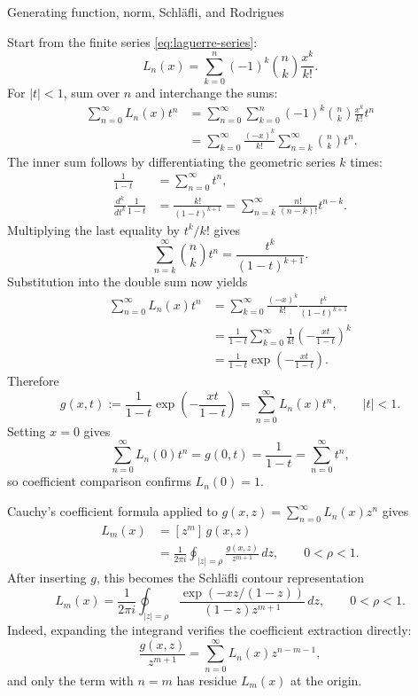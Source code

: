 \documentclass[11pt]{beamer}
\begin{document}
\begin{frame}[allowframebreaks]{Generating function, norm, Schl\"afli, and Rodrigues}
\footnotesize

Start from the finite series \eqref{eq:laguerre-series}:
\[
  L_n(x)=\sum_{k=0}^{n}(-1)^k\binom{n}{k}\frac{x^k}{k!}.
\]
For $|t|<1$, sum over $n$ and interchange the sums:
\begin{align*}
  \sum_{n=0}^{\infty}L_n(x)t^n
   &=
     \sum_{n=0}^{\infty}
     \sum_{k=0}^{n}
       (-1)^k\binom{n}{k}\frac{x^k}{k!}t^n\\
   &=
     \sum_{k=0}^{\infty}\frac{(-x)^k}{k!}
     \sum_{n=k}^{\infty}\binom{n}{k}t^n.
\end{align*}
The inner sum follows by differentiating the geometric series $k$ times:
\begin{align*}
  \frac{1}{1-t}
    &=\sum_{n=0}^{\infty}t^n,\\
  \frac{d^k}{dt^k}\frac{1}{1-t}
    &=\frac{k!}{(1-t)^{k+1}}
      =\sum_{n=k}^{\infty}\frac{n!}{(n-k)!}t^{n-k}.
\end{align*}
Multiplying the last equality by $t^k/k!$ gives
\[
  \sum_{n=k}^{\infty}\binom{n}{k}t^n
    =\frac{t^k}{(1-t)^{k+1}}.
\]
Substitution into the double sum now yields
\begin{align*}
  \sum_{n=0}^{\infty}L_n(x)t^n
    &=
      \sum_{k=0}^{\infty}
      \frac{(-x)^k}{k!}
      \frac{t^k}{(1-t)^{k+1}}\\
    &=
      \frac{1}{1-t}
      \sum_{k=0}^{\infty}
      \frac{1}{k!}
      \left(-\frac{xt}{1-t}\right)^k\\
    &=
      \frac{1}{1-t}
      \exp\!\left(-\frac{xt}{1-t}\right).
\end{align*}
Therefore
\begin{equation}
  g(x,t)
    :=\frac{1}{1-t}\exp\!\left(-\frac{xt}{1-t}\right)
    =\sum_{n=0}^{\infty}L_n(x)t^n,
  \qquad |t|<1.
  \label{eq:laguerre-gen}
\end{equation}
Setting $x=0$ gives
\[
  \sum_{n=0}^{\infty}L_n(0)t^n
    =g(0,t)
    =\frac{1}{1-t}
    =\sum_{n=0}^{\infty}t^n,
\]
so coefficient comparison confirms $L_n(0)=1$.

\medskip
Cauchy's coefficient formula applied to
$g(x,z)=\sum_{n=0}^{\infty}L_n(x)z^n$ gives
\begin{align*}
  L_m(x)
    &=[z^m]\,g(x,z)\\
    &=\frac{1}{2\pi i}
      \oint_{|z|=\rho}\frac{g(x,z)}{z^{m+1}}\,dz,
      \qquad 0<\rho<1.
\end{align*}
After inserting $g$, this becomes the Schl\"afli contour representation
\begin{equation}
  L_m(x)
    =\frac{1}{2\pi i}
      \oint_{|z|=\rho}
      \frac{\exp\!\left(-xz/(1-z)\right)}
           {(1-z)z^{m+1}}\,dz,
  \qquad 0<\rho<1.
  \label{eq:laguerre-schlafli}
\end{equation}
Indeed, expanding the integrand verifies the coefficient extraction directly:
\[
  \frac{g(x,z)}{z^{m+1}}
    =\sum_{n=0}^{\infty}L_n(x)z^{n-m-1},
\]
and only the term with $n=m$ has residue $L_m(x)$ at the origin.


\end{frame}
\end{document}
